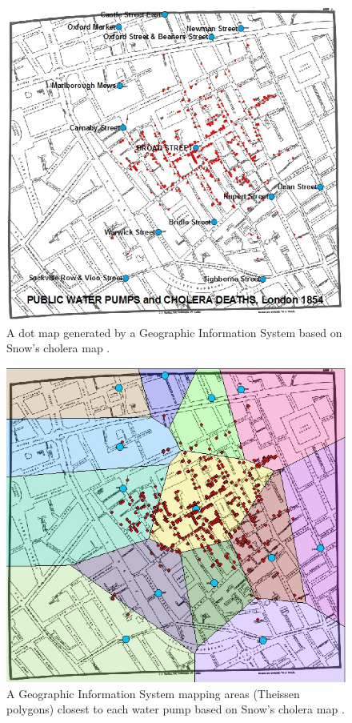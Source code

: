 \documentclass[12pt]{article}
\begin{document}
\begin{figure}
\centering
\includegraphics[scale=1.0]{gis}
\caption{A dot map generated by a Geographic Information System based on Snow's cholera map \cite{udel2}.}
\label{fig:gis}
\end{figure}

\begin{figure}
\centering
\includegraphics[scale=1.0]{gis_1}
\caption{ A Geographic Information System mapping areas (Theissen polygons) closest to each water pump based on Snow's cholera map \cite{udel2}.}
\label{fig:gis1}
\end{figure}
\end{document}
